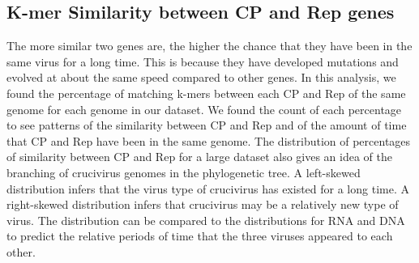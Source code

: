 \documentclass[eng]{ajceam-class}
\begin{document}
\subsection{K-mer Similarity between CP and Rep genes}

The more similar two genes are, the higher the chance that they have been in the same virus for a long time. This is because they have developed mutations and evolved at about the same speed compared to other genes. In this analysis, we found the percentage of matching k-mers between each CP and Rep of the same genome for each genome in our dataset. We found the count of each percentage to see patterns of the similarity between CP and Rep and of the amount of time that CP and Rep have been in the same genome. The distribution of percentages of similarity between CP and Rep for a large dataset also gives an idea of the branching of crucivirus genomes in the phylogenetic tree. A left-skewed distribution infers that the virus type of crucivirus has existed for a long time. A right-skewed distribution infers that crucivirus may be a relatively new type of virus. The distribution can be compared to the distributions for RNA and DNA to predict the relative periods of time that the three viruses appeared to each other.
\end{document}
